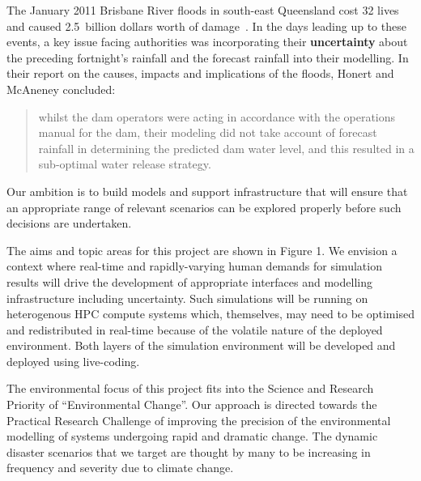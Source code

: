 The January 2011 Brisbane River floods in south-east Queensland cost
32 lives and caused 2.5~billion dollars worth of
damage~\parencite{vandenhonert2011}. In the days leading up to these
events, a key issue facing authorities was incorporating their
\textbf{uncertainty} about the preceding fortnight's rainfall and the
forecast rainfall into their modelling. In their report on the causes,
impacts and implications of the floods,  Honert and McAneney \cite{vandenhonert2011}
concluded:
\blockquote{whilst the dam operators were acting in accordance with the operations manual for the dam, their modeling did not take account of forecast rainfall in determining the predicted dam water level, and this resulted in a sub-optimal water release strategy. }

Our ambition is to build models 
and support infrastructure that will ensure that an appropriate range of relevant scenarios
can be explored properly before such decisions are undertaken.

The aims and topic areas for this project are
shown in Figure 1. We envision a context where real-time and rapidly-varying human demands for 
simulation results will drive the development of appropriate interfaces and modelling infrastructure including uncertainty. 
Such simulations will be running on heterogenous HPC compute systems which, themselves, may need to be optimised and redistributed in real-time because of the volatile nature of the deployed environment. Both layers of the simulation environment will be developed and deployed using live-coding.  

The environmental focus of this project fits into the Science and Research Priority of ``Environmental Change''. Our approach is directed towards the Practical Research Challenge of improving the precision of the environmental modelling of systems undergoing rapid and dramatic change. The dynamic disaster scenarios that we target are thought by many to be increasing in frequency and severity due to climate change.\\
 

